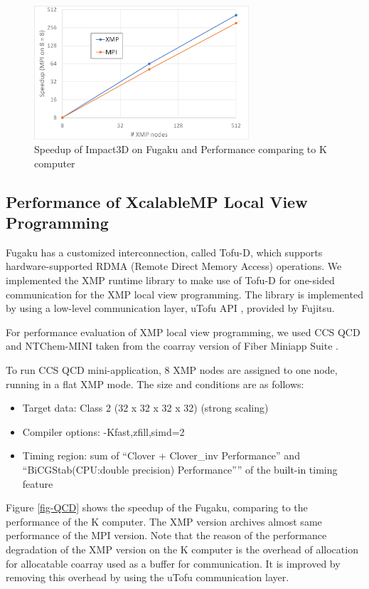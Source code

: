 ﻿\documentclass[graybox]{svmult}
\begin{document}
\begin{figure}[thb]
\begin{center}
\includegraphics[width=8cm]{./figure/Perf-impact3D.png}
\caption{Speedup of Impact3D on Fugaku and Performance comparing to K computer}
\label{fig-impact3D}
\end{center}
\end{figure}

\subsection{Performance of XcalableMP Local View Programming}

Fugaku has a customized interconnection, called Tofu-D, which supports hardware-supported RDMA (Remote Direct Memory Access) operations. We implemented the XMP runtime library to make use of Tofu-D for one-sided communication for the XMP local view programming. The library is implemented by using a low-level communication layer, uTofu API \cite{uTofu}, provided by Fujitsu.

For performance evaluation of XMP local view programming,
we used CCS QCD and NTChem-MINI taken from the coarray version of Fiber Miniapp Suite \cite{Fiber}\cite{Murai2017}.

To run CCS QCD mini-application\cite{CCS-QCD}, 8 XMP nodes are assigned to one node, running in a flat XMP mode.
The size and conditions are as follows:

\begin{itemize}
\item Target data: Class 2 (32 x 32 x 32 x 32) (strong scaling)
\item Compiler options: -Kfast,zfill,simd=2
\item Timing region: sum of ``Clover + Clover\_inv Performance''
and ``BiCGStab(CPU:double precision) Performance''” of the
built-in timing feature
\end{itemize}

Figure \ref{fig-QCD} shows the speedup of the Fugaku,
comparing to the performance of the K computer.
The XMP version archives almost same performance of the MPI version.
Note that the reason of the performance degradation of the XMP version on the K computer is the overhead of allocation for allocatable coarray used as a buffer for communication. It is improved by removing this overhead by using the uTofu communication layer.
\end{document}
